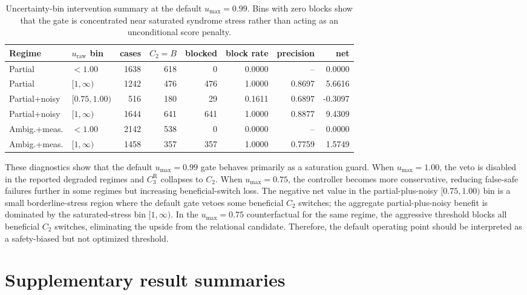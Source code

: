 \documentclass[11pt]{article}
\numberwithin{equation}{section}
\begin{document}
\begin{table}[ht]
\centering
\scriptsize
\setlength{\tabcolsep}{3pt}
\caption{Uncertainty-bin intervention summary at the default $u_{\max}=0.99$.
Bins with zero blocks show that the gate is concentrated near saturated syndrome
stress rather than acting as an unconditional score penalty.}
\label{tab:uncertainty-bin}
\begin{tabular}{@{}llrrrrrr@{}}
\toprule
Regime & $u_{\mathrm{raw}}$ bin & cases & $C_2=B$ & blocked &
block rate & precision & net \\
\midrule
Partial & $<1.00$ & 1638 & 618 & 0 & 0.0000 & -- & 0.0000 \\
Partial & $[1,\infty)$ & 1242 & 476 & 476 & 1.0000 & 0.8697 & 5.6616 \\
Partial+noisy & $[0.75,1.00)$ & 516 & 180 & 29 & 0.1611 & 0.6897 & -0.3097 \\
Partial+noisy & $[1,\infty)$ & 1644 & 641 & 641 & 1.0000 & 0.8877 & 9.4309 \\
Ambig.+meas. & $<1.00$ & 2142 & 538 & 0 & 0.0000 & -- & 0.0000 \\
Ambig.+meas. & $[1,\infty)$ & 1458 & 357 & 357 & 1.0000 & 0.7759 & 1.5749 \\
\bottomrule
\end{tabular}
\end{table}

These diagnostics show that the default $u_{\max}=0.99$ gate behaves primarily as
a saturation guard. When $u_{\max}=1.00$, the veto is disabled in the reported
degraded regimes and $C_3^{\mathrm R}$ collapses to $C_2$. When
$u_{\max}=0.75$, the controller becomes more conservative, reducing false-safe
failures further in some regimes but increasing beneficial-switch loss. The
negative net value in the partial-plus-noisy $[0.75,1.00)$ bin is a small
borderline-stress region where the default gate vetoes some beneficial
$C_2$ switches; the aggregate partial-plus-noisy benefit is dominated by the
saturated-stress bin $[1,\infty)$. In the $u_{\max}=0.75$ counterfactual for the
same regime, the aggressive threshold blocks all beneficial $C_2$ switches,
eliminating the upside from the relational candidate. Therefore, the default
operating point should be interpreted as a safety-biased but not optimized
threshold.

\FloatBarrier

\section{Supplementary result summaries}
\end{document}
